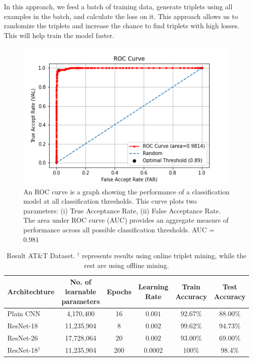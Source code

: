 \documentclass[aps,prb,twocolumn,superscriptaddress,floatfix,longbibliography, nofootinbib]{revtex4-2}
\newif\ifptitle
\newif\ifpnumber
\newcounter{para}
\newcommand\ptitle[1]{\par\refstepcounter{para}
{\ifpnumber{\noindent\textcolor{lightgray}{\textbf{\thepara}}\indent}\fi}
{\ifptitle{\textbf{[{#1}]}}\fi}}
\begin{document}
\ptitle{Online Triplet Mining} 
In this approach, we feed a batch of training data, generate triplets using all examples in the batch, and calculate the loss on it. This approach allows us to randomize the triplets and increase the chance to find triplets with high losses. This will help train the model faster. 
\begin{figure}[h!]
    \includegraphics[clip=true,width=\columnwidth]{ROC_curve_ATT_test_dataset.png}
    \caption{An ROC curve is a graph showing the performance of a classification model at all classification thresholds. This curve plots two parameters: (i) True Acceptance Rate, (ii) False Acceptance Rate. The area under ROC curve (AUC) provides an aggregate measure of performance across all possible classification thresholds. AUC = $0.981$} 
     \label{fig:eer_roc}
\end{figure}

\begin{table}[t]
    \begin{center}
    \caption{Result AT\&T Dataset. $^\dagger$ represents results using online triplet mining, while the rest are using offline mining.}
    \label{tab:att}
    \begin{tabular}{l|c|c|c|c|c}
    \hline
    \textbf{Architechture} & \textbf{No. of learnable parameters} & \textbf{Epochs} & \textbf{Learning Rate} & \textbf{Train Accuracy} & \textbf{Test Accuracy} \\
    \hline \hline
    Plain CNN     & 4,170,400                   & 16     & $0.001$         & 92.67\%        & 88.00\%       \\
    ResNet-18     & 11,235,904                  & 8      & $0.002$         & 99.62\%        & 94.73\%       \\
    ResNet-26     & 17,728,064                  & 20     & $0.002$         & 93.00\%        & 69.00\%       \\
    {ResNet-18}$^\dagger$     & 11,235,904                  & 200    & $0.0002$          & 100\%          & 98.4\%   \\
    \hline
    \end{tabular}
    \end{center}
\end{table}
\end{document}
